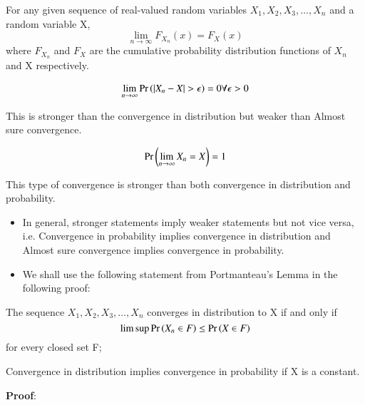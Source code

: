 \begin{definition}
    For any given sequence of real-valued random variables $X_1,X_2,X_3, \dots ,X_n$ and a random variable X,
    \begin{equation}
    \lim_{n \rightarrow \infty} F_{X_n}(x) = F_X(x)
\end{equation}
where $F_{X_n}$ and $F_X$ are the cumulative probability distribution functions of $X_n$ and X respectively.
\end{definition}
\begin{definition}
    \begin{align}
    \lim_{n \rightarrow \infty} \Pr\left(|X_n - X| > \epsilon\right) = 0 \forall \epsilon > 0
\end{align}
\end{definition}
This is stronger than the convergence in distribution but weaker than Almost sure convergence.
\begin{definition}
    \begin{align}
  \Pr\left(\lim_{n \rightarrow \infty} X_n = X\right) = 1  
\end{align}
\end{definition}
This type of convergence is stronger than both convergence in distribution and probability.
\begin{itemize}
    \item In general, stronger statements imply weaker statements but not vice versa, i.e. Convergence in probability implies convergence in distribution and Almost sure convergence implies convergence in probability.
    \item We shall use the following statement from Portmanteau's Lemma in the following proof:
    \end{itemize}
    \begin{lemma}\label{conv/5/Portmanteau's Lemma}
             The sequence $X_1,X_2,X_3, \dots ,X_n$ converges in distribution to X if and only if \begin{equation}
                  \limsup \Pr\left(X_{n}\in F\right) \leq \Pr\left(X \in F\right)
             \end{equation} for every closed set F;
        \end{lemma}
\begin{lemma} Convergence in distribution implies convergence in probability if X is a constant.\end{lemma}
    \textbf{Proof}:
